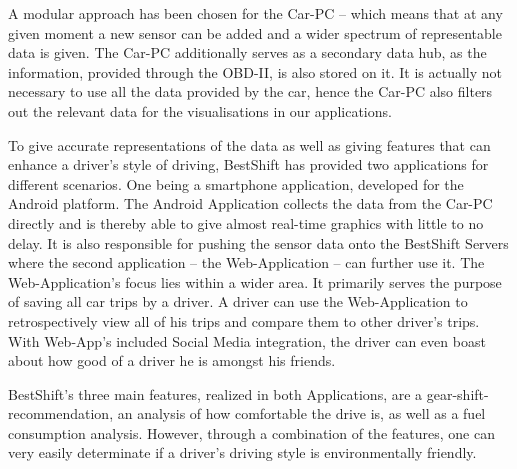 A modular approach has been chosen for the Car-PC – which means that at any given moment a new sensor can be added and a wider spectrum of representable data is given. The Car-PC additionally serves as a secondary data hub, as the information, provided through the OBD-II, is also stored on it. It is actually not necessary to use all the data provided by the car, hence the Car-PC also filters out the relevant data for the visualisations in our applications.

To give accurate representations of the data as well as giving features that can enhance a driver’s style of driving, BestShift has provided two applications for different scenarios. One being a smartphone application, developed for the Android platform. The Android Application collects the data from the Car-PC directly and is thereby able to give almost real-time graphics with little to no delay. It is also responsible for pushing the sensor data onto the BestShift Servers where the second application – the Web-Application – can further use it. The Web-Application’s focus lies within a wider area. It primarily serves the purpose of saving all car trips by a driver. A driver can use the Web-Application to retrospectively view all of his trips and compare them to other driver’s trips. With Web-App’s included Social Media integration, the driver can even boast about how good of a driver he is amongst his friends.

BestShift’s three main features, realized in both Applications, are a gear-shift-recommendation, an analysis of how comfortable the drive is, as well as a fuel consumption analysis. However, through a combination of the features, one can very easily determinate if a driver’s driving style is environmentally friendly.